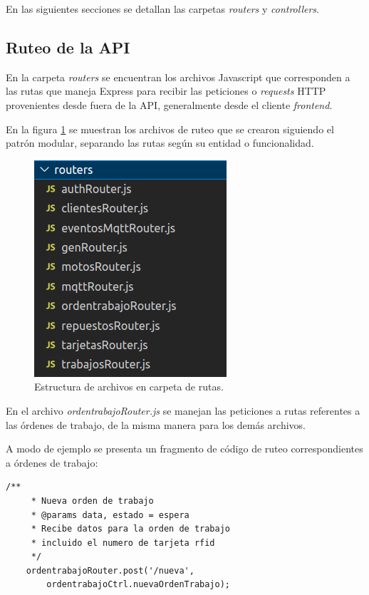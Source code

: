 En las siguientes secciones se detallan las carpetas \textit{routers} y \textit{controllers}.

\subsection{Ruteo de la API}
\label{subsec:apirouters}

En la carpeta \textit{routers} se encuentran los archivos Javascript que corresponden a las rutas que maneja Express para recibir las peticiones o \textit{requests} HTTP provenientes desde fuera de la API, generalmente desde el cliente \textit{frontend}.

En la figura \ref{fig:apiroutes} se muestran los archivos de ruteo que se crearon siguiendo el patrón modular, separando las rutas según su entidad o funcionalidad.

\begin{figure}[ht]
	\centering
	\includegraphics[scale=.50]{./Figures/api-routes.png}
	\caption{Estructura de archivos en carpeta de rutas.}
	\label{fig:apiroutes}
\end{figure}

En el archivo \textit{ordentrabajoRouter.js} se manejan las peticiones a rutas referentes a las órdenes de trabajo, de la misma manera para los demás archivos. 

A modo de ejemplo se presenta un fragmento de código de ruteo correspondientes a órdenes de trabajo:


\begin{lstlisting}[label=cod:routesot,caption=Código de ruteo para órdenes de trabajo.]
    /**
     * Nueva orden de trabajo
     * @params data, estado = espera
     * Recibe datos para la orden de trabajo
     * incluido el numero de tarjeta rfid
     */
    ordentrabajoRouter.post('/nueva',
        ordentrabajoCtrl.nuevaOrdenTrabajo);
\end{lstlisting}

